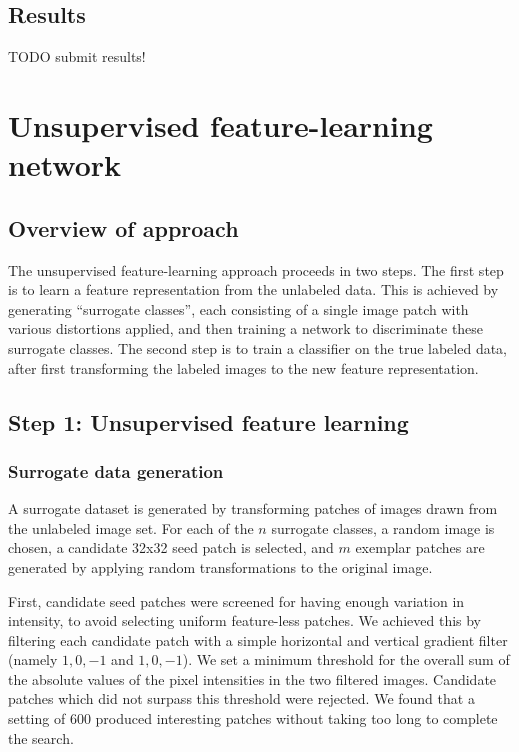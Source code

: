 \documentclass{article} %
\begin{document}
\subsection{Results}

TODO submit results!

\section{Unsupervised feature-learning network}

\subsection{Overview of approach}

The unsupervised feature-learning approach proceeds in two steps. The first step is to learn a feature representation from the unlabeled data. This is achieved by generating ``surrogate classes'', each consisting of a single image patch with various distortions applied, and then training a network to discriminate these surrogate classes. The second step is to train a classifier on the true labeled data, after first transforming the labeled images to the new feature representation.

\subsection{Step 1: Unsupervised feature learning}

\subsubsection{Surrogate data generation}

A surrogate dataset is generated by transforming patches of images drawn from the unlabeled image set. For each of the $n$ surrogate classes, a random image is chosen, a candidate 32x32 seed patch is selected, and $m$ exemplar patches are generated by applying random transformations to the original image.

First, candidate seed patches were screened for having enough variation in intensity, to avoid selecting uniform feature-less patches. We achieved this by filtering each candidate patch with a simple horizontal and vertical gradient filter (namely ${{1, 0, -1}}$ and ${{1},{0},{-1}}$). We set a minimum threshold for the overall sum of the absolute values of the pixel intensities in the two filtered images. Candidate patches which did not surpass this threshold were rejected. We found that a setting of $600$ produced interesting patches without taking too long to complete the search. 
\end{document}
